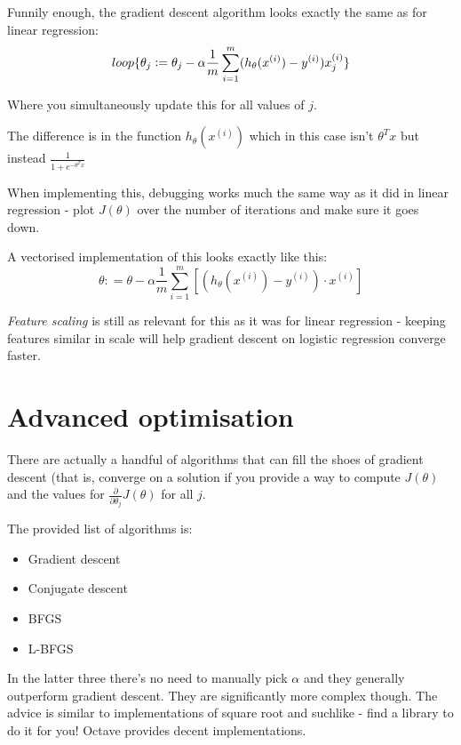 Funnily enough, the gradient descent algorithm looks exactly the same as for linear regression:
\begin{equation}
loop \{\\
\theta_j \mathrel{\mathop:}=
\theta_j - \alpha\frac{1}{m}
\sum_{i=1}^{m}
(h_\theta(x^{(i)}) - y^{(i)})x_j^{(i)} \\
\}
\end{equation}

Where you simultaneously update this for all values of $j$.

The difference is in the function $h_\theta(x^{(i)})$ which in this case isn't $\theta^Tx$ but instead $\frac{1}{1 + e^{-\theta^Tx}}$

When implementing this, debugging works much the same way as it did in linear regression - plot $J(\theta)$ over the number of iterations and make sure it goes down.

A vectorised implementation of this looks exactly like this:
\[
\theta \mathrel{\mathop:}=
\theta - \alpha\frac{1}{m}
\sum_{i=1}^{m}
[(h_\theta(x^{(i)}) - y^{(i)}) \cdot x^{(i)}]
\]

\emph{Feature scaling} is still as relevant for this as it was for linear regression - keeping features similar in scale will help gradient descent on logistic regression converge faster.

\section{Advanced optimisation}
There are actually a handful of algorithms that can fill the shoes of gradient descent (that is, converge on a solution if you provide a way to compute $J(\theta)$ and the values for $\frac{\partial}{\partial\theta_j}J(\theta)$ for all $j$.

The provided list of algorithms is:

\begin{itemize}
\item Gradient descent
\item Conjugate descent
\item BFGS
\item L-BFGS
\end{itemize}

In the latter three there's no need to manually pick $\alpha$ and they generally outperform gradient descent. They are significantly more complex though. The advice is similar to implementations of square root and suchlike - find a library to do it for you! Octave provides decent implementations.


